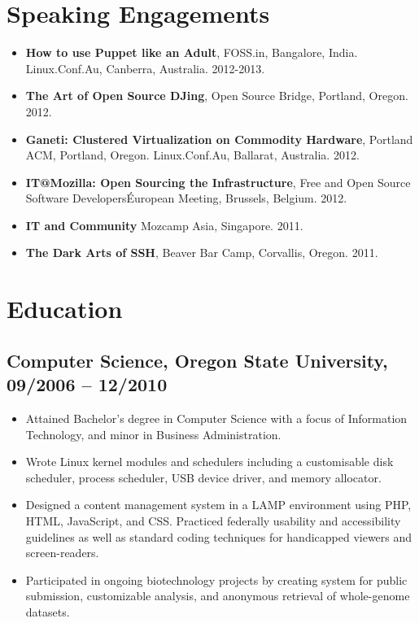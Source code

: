\documentclass[a4paper,12pt]{report}
\begin{document}
\section*{Speaking Engagements}
\begin{itemize}
        \item \textbf{How to use Puppet like an Adult}, FOSS.in, Bangalore, India. Linux.Conf.Au, Canberra, Australia. 2012-2013.
        \item \textbf{The Art of Open Source DJing}, Open Source Bridge, Portland, Oregon. 2012.
        \item \textbf{Ganeti: Clustered Virtualization on Commodity Hardware}, Portland ACM, Portland, Oregon. Linux.Conf.Au, Ballarat, Australia. 2012.
        \item \textbf{IT@Mozilla: Open Sourcing the Infrastructure}, Free and Open Source Software Developers\' European Meeting, Brussels, Belgium. 2012.
        \item \textbf{IT and Community} Mozcamp Asia, Singapore. 2011.
        \item \textbf{The Dark Arts of SSH}, Beaver Bar Camp, Corvallis, Oregon. 2011.
\end{itemize}

\section*{Education}

\subsection*{Computer Science, Oregon State University, 09/2006 -- 12/2010}
\begin{itemize}
\item Attained Bachelor’s degree in Computer Science with a focus of Information Technology, and minor in Business Administration.
\item Wrote Linux kernel modules and schedulers including a customisable disk scheduler, process scheduler, USB device driver, and memory allocator.
\item Designed a content management system in a LAMP environment using PHP, HTML, JavaScript, and CSS. Practiced federally usability and accessibility guidelines as well as standard coding techniques for handicapped viewers and screen-readers.
\item Participated in ongoing biotechnology projects by creating system for public submission, customizable analysis, and anonymous retrieval of whole-genome datasets.

\end{itemize}
\end{document}
